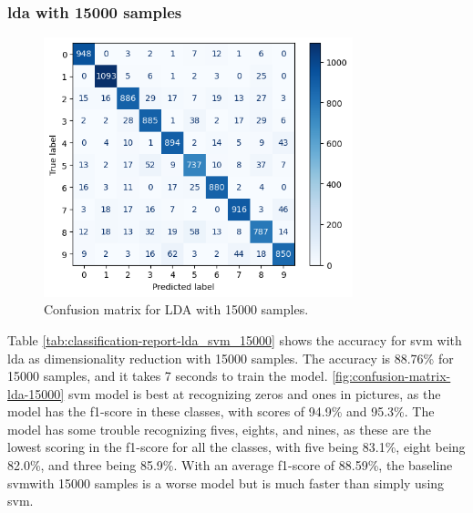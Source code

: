 \subsubsection{\gls{lda} with 15000 samples}\label{subsubsec:experiment-1-results-lda-15000}
\begin{figure}[htb!]
    \centering
    \includegraphics[width=0.8\textwidth]{figures/1-experiment/confusion_matrix_lda_svm_15000.png}
    \caption{Confusion matrix for LDA with 15000 samples.}
    \label{fig:confusion-matrix-lda-15000}
\end{figure}
Table \ref{tab:classification-report-lda_svm_15000} shows the accuracy for \gls{svm} with \gls{lda} as dimensionality reduction with 15000 samples. The accuracy is 88.76\% for 15000 samples, and it takes 7 seconds to train the model. \autoref{fig:confusion-matrix-lda-15000} \gls{svm} model is best at recognizing zeros and ones in pictures, as the model has the f1-score in these classes, with scores of 94.9\% and 95.3\%. The model has some trouble recognizing fives, eights, and nines, as these are the lowest scoring in the f1-score for all the classes, with five being 83.1\%, eight being 82.0\%, and three being 85.9\%. With an average f1-score of 88.59\%, the baseline \gls{svm}with 15000 samples is a worse model but is much faster than simply using \gls{svm}.

